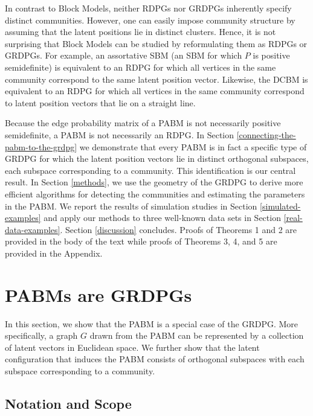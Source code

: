 \documentclass[12pt]{article}
\begin{document}
In contrast to Block Models, neither RDPGs nor GRDPGs inherently
specify distinct communities.  However, one can easily impose
community structure by assuming that the latent positions lie in
distinct clusters.  Hence, it is not surprising that Block Models can
be studied by reformulating them as RDPGs or GRDPGs.  For example, an
assortative SBM (an SBM for which $P$ is positive semidefinite) is
equivalent to an RDPG for which all vertices in the same community
correspond to the same latent position vector.
Likewise, the DCBM is equivalent to an RDPG for which all vertices in
the same community correspond to latent position vectors that lie on a
straight line. 

Because the edge probability matrix of a PABM is not necessarily
positive semidefinite, a PABM is not necessarily an RDPG.  In Section
\ref{connecting-the-pabm-to-the-grdpg} we demonstrate that every PABM
is in fact a specific type of GRDPG for which the latent position
vectors lie in distinct orthogonal subspaces, each subspace
corresponding to a community.  This identification is our central
result.  In Section \ref{methods}, we use the geometry of the GRDPG to
derive more efficient algorithms for detecting the communities and
estimating the parameters in the PABM.  We report the results of
simulation studies in Section \ref{simulated-examples} and apply our
methods to three well-known data sets in Section
\ref{real-data-examples}. Section \ref{discussion} concludes.
Proofs of Theorems 1 and 2 are provided in the body of the text while proofs of 
Theorems 3, 4, and 5 are provided in the Appendix. 

\hypertarget{connecting-the-popularity-adjusted-block-model-to-the-generalized-random-dot-product-graph}{%
\section{PABMs are GRDPGs}\label{connecting-the-popularity-adjusted-block-model-to-the-generalized-random-dot-product-graph}}

In this section, we show that the PABM is a special case of the GRDPG. 
More specifically, a graph $G$ drawn from the PABM can be represented by 
a collection of latent vectors in Euclidean space. 
We further show that the latent configuration that
induces the PABM consists of orthogonal subspaces with each subspace
corresponding to a community.

\hypertarget{notation}{%
\subsection{Notation and Scope}\label{notation}}
\end{document}
